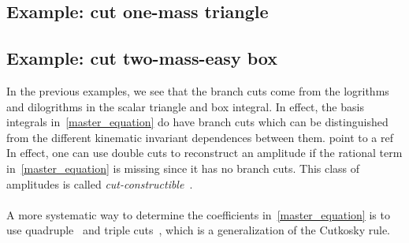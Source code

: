 \subsection{Example: cut one-mass triangle}

\subsection{Example: cut two-mass-easy box}


%
In the previous examples, we see that the branch cuts come from the logrithms and dilogrithms in the scalar triangle and box integral. 
In effect, the basis integrals in~\cref{master_equation} do have branch cuts which can be distinguished from the different kinematic invariant dependences between them.
\color{red}point to a ref\color{black}
In effect, one can use double cuts to reconstruct an amplitude if the rational term in~\cref{master_equation} is missing since it has no branch cuts.
This class of amplitudes is called \textit{cut-constructible}~\cite{Bern:1994cg}. 
\\\\
A more systematic way to determine the coefficients in~\cref{master_equation} is to use quadruple~\cite{BRITTO2005499} and triple cuts~\cite{Forde:2007mi}, which is a generalization of the Cutkosky rule.